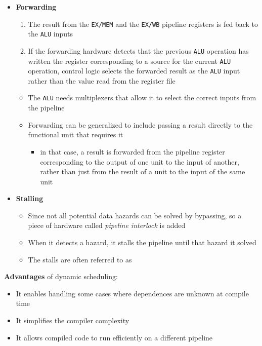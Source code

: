\documentclass[english]{article}
\begin{document}
\begin{itemize}
  \item \textbf{Forwarding}
        \begin{enumerate}
          \item The result from the \texttt{EX/MEM} and the \texttt{EX/WB} pipeline registers is fed back to the \texttt{ALU} inputs
          \item If the forwarding hardware detects that the previous \texttt{ALU} operation has written the register corresponding to a source for the current \texttt{ALU} operation, control logic selects the forwarded result as the \texttt{ALU} input rather than the value read from the register file
        \end{enumerate}
        \begin{itemize}
          \item The \texttt{ALU} needs multiplexers that allow it to select the correct inputs from the pipeline
          \item Forwarding can be generalized to include passing a result directly to the functional unit that requires it
                \begin{itemize}
                  \item in that case, a result is forwarded from the pipeline register corresponding to the output of one unit to the input of another, rather than just from the result of a unit to the input of the same unit
                \end{itemize}
        \end{itemize}
  \item \textbf{Stalling}
        \begin{itemize}
          \item Since not all potential data hazards can be solved by bypassing, so a piece of hardware called \textit{pipeline interlock} is added
          \item When it detects a hazard, it stalls the pipeline until that hazard it solved
          \item The stalls are often referred to as 
        \end{itemize}
\end{itemize}

\bigskip
\textbf{Advantages} of dynamic scheduling:
\begin{itemize}
  \item It enables handling some cases where dependences are unknown at compile time
  \item It simplifies the compiler complexity
  \item It allows compiled code to run efficiently on a different pipeline
\end{itemize}
\end{document}
